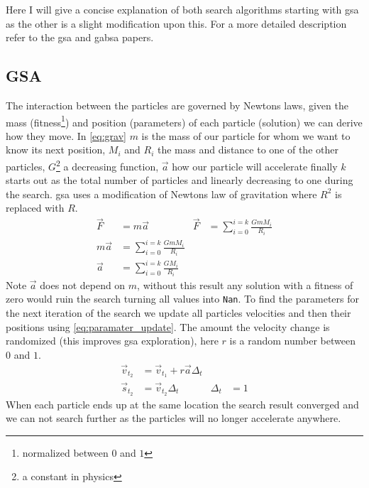 Here I will give a concise explanation of both search algorithms starting with \ac{gsa} as the other is a slight modification upon this. For a more detailed description refer to the \ac{gsa}\cite{GSA} and \ac{gabsa}\cite{GABSA} papers.
%
\subsection{GSA} \label{sec:GSA}
The interaction between the particles are governed by Newtons laws, given the mass (fitness\footnote{normalized between $0$ and $1$}) and position (parameters) of each particle (solution) we can derive how they move. In \cref{eq:grav} $m$ is the mass of our particle for whom we want to know its next position, $M_i$ and $R_i$ the mass and distance to one of the other particles, $G$\footnote{a constant in physics} a decreasing function, $\vec{a}$ how our particle will accelerate finally $k$ starts out as the total number of particles and linearly decreasing to one during the search.
\ac{gsa} uses a modification of Newtons law of gravitation where $R^2$ is replaced with $R$.
%
\begin{subequations}
\begin{align} \label{eq:grav}
	\vec{F}&=m\vec{a} &            \vec{F}&=\sum_{i=0}^{i=k} \frac{GmM_i}{R_i} \\
	m\vec{a} &= \sum_{i=0}^{i=k} \frac{GmM_i}{R_i} \\
	\vec{a} &= \sum_{i=0}^{i=k} \frac{GM_i}{R_i}
\end{align}
\end{subequations}
%
Note $\vec{a}$ does not depend on $m$, without this result any solution with a fitness of zero would ruin the search turning all values into \texttt{Nan}. To find the parameters for the next iteration of the search we update all particles velocities and then their positions using \cref{eq:paramater_update}. The amount the velocity change is randomized (this improves \ac{gsa} exploration), here $r$ is a random number between $0$ and $1$.
%
\begin{subequations}
\begin{align} \label{eq:paramater_update}
	\vec{v}_{t_2} &= \vec{v}_{t_1} + r \vec{a}\Delta_t \\
	\vec{s}_{t_2} &= \vec{v}_{t_2}\Delta_t & \Delta_t &= 1 \label{eq:pos_update}
\end{align}
\end{subequations}
%
When each particle ends up at the same location the search result converged and we can not search further as the particles will no longer accelerate anywhere.
%
